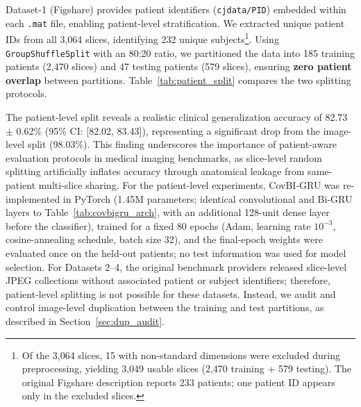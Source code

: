 \documentclass[a4paper,fleqn]{cas-sc}
\begin{document}
Dataset-1 (Figshare) provides patient identifiers (\texttt{cjdata/PID}) embedded within each \texttt{.mat} file, enabling patient-level stratification. We extracted unique patient IDs from all 3,064 slices, identifying 232 unique subjects\footnote{Of the 3,064 slices, 15 with non-standard dimensions were excluded during preprocessing, yielding 3,049 usable slices (2,470 training + 579 testing). The original Figshare description reports 233 patients; one patient ID appears only in the excluded slices.}. Using \texttt{GroupShuffleSplit} with an 80:20 ratio, we partitioned the data into 185 training patients (2,470 slices) and 47 testing patients (579 slices), ensuring \textbf{zero patient overlap} between partitions. Table~\ref{tab:patient_split} compares the two splitting protocols.

\begin{table}[!htbp]
\centering
\caption{Effect of Patient-Level vs.\ Image-Level Splitting on Dataset-1}
\label{tab:patient_split}
\small
{}
\end{table}

The patient-level split reveals a realistic clinical generalization accuracy of 82.73 $\pm$ 0.62\% (95\% CI: [82.02, 83.43]), representing a significant drop from the image-level split (98.03\%). This finding underscores the importance of patient-aware evaluation protocols in medical imaging benchmarks, as slice-level random splitting artificially inflates accuracy through anatomical leakage from same-patient multi-slice sharing. For the patient-level experiments, CovBI-GRU was re-implemented in PyTorch (1.45M parameters; identical convolutional and Bi-GRU layers to Table~\ref{tab:covbigru_arch}, with an additional 128-unit dense layer before the classifier), trained for a fixed 80 epochs (Adam, learning rate $10^{-3}$, cosine-annealing schedule, batch size 32), and the final-epoch weights were evaluated once on the held-out patients; no test information was used for model selection. For Datasets 2--4, the original benchmark providers released slice-level JPEG collections without associated patient or subject identifiers; therefore, patient-level splitting is not possible for these datasets. Instead, we audit and control image-level duplication between the training and test partitions, as described in Section~\ref{sec:dup_audit}.
\end{document}
